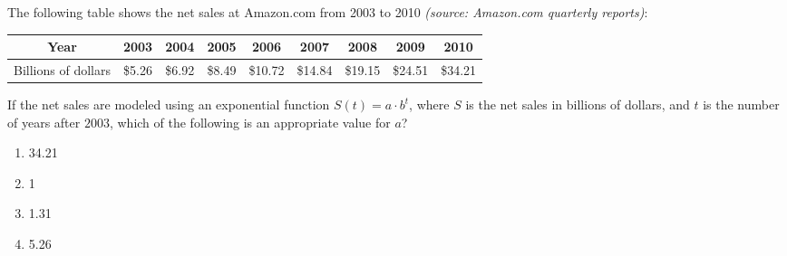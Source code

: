 \bigskip

\item The following table shows  the net sales at Amazon.com from 2003 to 2010 {\it (source:  Amazon.com quarterly reports)}:

\begin{center}
\begin{tabular}{|c|c|c|c|c|c|c|c|c|}
\hline
Year & 2003&2004&2005&2006&2007&2008&2009&2010\\
\hline
Billions of dollars & {\$}5.26 & {\$}6.92 & {\$}8.49 & {\$}10.72 &{\$}14.84 & {\$}19.15 & {\$}24.51 & {\$}34.21\\
\hline
\end{tabular}
\end{center}

If the net sales are modeled using an exponential function $S(t)=a\cdot b^t$, where $S$ is the net sales in billions of dollars, and $t$ is the number of years after $2003$, which of the following is an appropriate value for $a$?

\begin{enumerate}
\item 34.21
\item 1
\item 1.31
\item 5.26
\end{enumerate}

